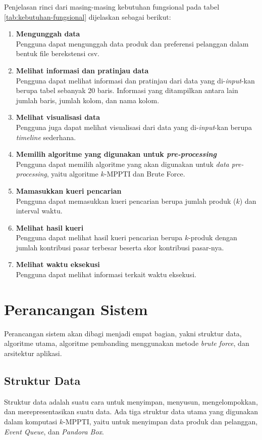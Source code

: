 Penjelasan rinci dari masing-masing kebutuhan fungsional pada tabel \ref{tab:kebutuhan-fungsional} dijelaskan sebagai berikut:
\begin{enumerate}
	\item \textbf{Mengunggah data}\\
	\tab Pengguna dapat mengunggah data produk dan preferensi pelanggan dalam bentuk file berekstensi csv.
	\item \textbf{Melihat informasi dan pratinjau data} \\
	\tab Pengguna dapat melihat informasi dan pratinjau dari data yang di-\textit{input}-kan berupa tabel sebanyak 20 baris. Informasi yang ditampilkan antara lain jumlah baris, jumlah kolom, dan nama kolom.
	\item \textbf{Melihat visualisasi data} \\
	\tab Pengguna juga dapat melihat visualisasi dari data yang di-\textit{input}-kan berupa \textit{timeline} sederhana.
	\item \textbf{Memilih algoritme yang digunakan untuk \textit{pre-processing}} \\
	\tab Pengguna dapat memilih algoritme yang akan digunakan untuk \textit{data pre-processing}, yaitu algoritme $k$-MPPTI dan Brute Force.
	\item \textbf{Mamasukkan kueri pencarian} \\
	\tab Pengguna dapat memasukkan kueri pencarian berupa jumlah produk ($k$) dan interval waktu.
	\item \textbf{Melihat hasil kueri} \\
	\tab Pengguna dapat melihat hasil kueri pencarian berupa $k$-produk dengan jumlah kontribusi pasar terbesar beserta skor kontribusi pasar-nya. 
	\item \textbf{Melihat waktu eksekusi} \\
	\tab Pengguna dapat melihat informasi terkait waktu eksekusi.
\end{enumerate}

\section{Perancangan Sistem}
\tab Perancangan sistem akan dibagi menjadi empat bagian, yakni struktur data, algoritme utama, algoritme pembanding menggunakan metode \textit{brute force}, dan arsitektur aplikasi. 

\subsection{Struktur Data}
\tab Struktur data adalah suatu cara untuk menyimpan, menyusun, mengelompokkan, dan merepresentasikan suatu data. Ada tiga struktur data utama yang digunakan dalam komputasi $k$-MPPTI, yaitu untuk menyimpan data produk dan pelanggan, \textit{Event Queue}, dan \textit{Pandora Box}.

